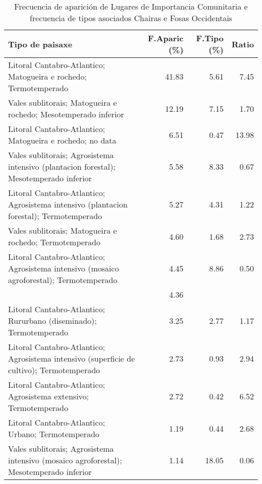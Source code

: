 \begin{table}[p]
\centering
\caption{Frecuencia de aparición de Lugares de Importancia Comunitaria e frecuencia de tipos asociados Chairas e Fosas Occidentais} 
\label{vnatura11}
\begin{tabular}{lrrr}
  \hline
Tipo de paisaxe & F.Aparic (\%) & F.Tipo (\%) & Ratio \\ 
  \hline
Litoral Cantabro-Atlantico; Matogueira e rochedo; Termotemperado & 41.83 & 5.61 & 7.45 \\ 
  Vales sublitorais; Matogueira e rochedo; Mesotemperado inferior & 12.19 & 7.15 & 1.70 \\ 
  Litoral Cantabro-Atlantico; Matogueira e rochedo; no data & 6.51 & 0.47 & 13.98 \\ 
  Vales sublitorais; Agrosistema intensivo (plantacion forestal); Mesotemperado inferior & 5.58 & 8.33 & 0.67 \\ 
  Litoral Cantabro-Atlantico; Agrosistema intensivo (plantacion forestal); Termotemperado & 5.27 & 4.31 & 1.22 \\ 
  Vales sublitorais; Matogueira e rochedo; Termotemperado & 4.60 & 1.68 & 2.73 \\ 
  Litoral Cantabro-Atlantico; Agrosistema intensivo (mosaico agroforestal); Termotemperado & 4.45 & 8.86 & 0.50 \\ 
   & 4.36 &  &  \\ 
  Litoral Cantabro-Atlantico; Rururbano (diseminado); Termotemperado & 3.25 & 2.77 & 1.17 \\ 
  Litoral Cantabro-Atlantico; Agrosistema intensivo (superficie de cultivo); Termotemperado & 2.73 & 0.93 & 2.94 \\ 
  Litoral Cantabro-Atlantico; Agrosistema extensivo; Termotemperado & 2.72 & 0.42 & 6.52 \\ 
  Litoral Cantabro-Atlantico; Urbano; Termotemperado & 1.19 & 0.44 & 2.68 \\ 
  Vales sublitorais; Agrosistema intensivo (mosaico agroforestal); Mesotemperado inferior & 1.14 & 18.05 & 0.06 \\ 
   \hline
\end{tabular}
\end{table}
